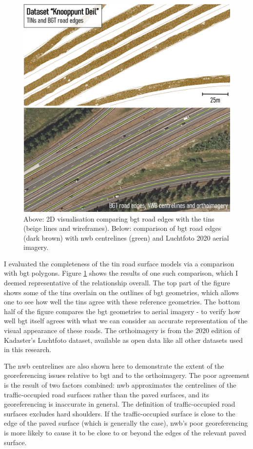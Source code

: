 \begin{figure}[h]
    \centering
    \includegraphics[width=0.77\linewidth]{final_report/figs/bgtcomparison.png}
    \caption[2D comparison renders of NWB, BGT and aerial imagery]{Above: 2D visualisation comparing \ac{bgt} road edges with the \ac{tin}s (beige lines and wireframes). Below: comparison of \ac{bgt} road edges (dark brown) with \ac{nwb} centrelines (green) and Luchtfoto 2020 aerial imagery.}
    \label{fig:bgtcomparison}
\end{figure}

I evaluated the completeness of the \ac{tin} road surface models via a comparison with \ac{bgt} polygons. Figure \ref{fig:bgtcomparison} shows the results of one such comparison, which I deemed representative of the relationship overall. The top part of the figure shows some of the \ac{tin}s overlain on the outlines of \ac{bgt} geometries, which allows one to see how well the \ac{tin}s agree with these reference geometries. The bottom half of the figure compares the \ac{bgt} geometries to aerial imagery - to verify how well \ac{bgt} itself agrees with what we can consider an accurate representation of the visual appearance of these roads. The orthoimagery is from the 2020 edition of Kadaster's Luchtfoto dataset, available as open data like all other datasets used in this research.

The \ac{nwb} centrelines are also shown here to demonstrate the extent of the georeferencing issues relative to \ac{bgt} and to the orthoimagery. The poor agreement is the result of two factors combined: \ac{nwb} approximates the centrelines of the traffic-occupied road surfaces rather than the paved surfaces, and its georeferencing is inaccurate in general. The definition of traffic-occupied road surfaces excludes hard shoulders. If the traffic-occupied surface is close to the edge of the paved surface (which is generally the case), \ac{nwb}'s poor georeferencing is more likely to cause it to be close to or beyond the edges of the relevant paved surface.


